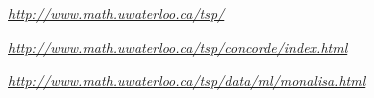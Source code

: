 \begin{thebibliography}{1}

\begin{comment}
\bibitem{alg} Pierluigi Crescenzi, Pierre Fraigniaud, Magnus Halldórsson, Hovhannes A. Harutyunyand, Chiara Pierucci, Andrea Pietracaprina, Geppino Pucci \emph {On the complexity of the shortest-path broadcast problem, Discrete Applied Mathematics , vol. 199, pp. 101-109, 2016.}
\end{comment}

 \emph{\url{http://www.math.uwaterloo.ca/tsp/}}

 \emph{\url{http://www.math.uwaterloo.ca/tsp/concorde/index.html}}

 \emph{\url{http://www.math.uwaterloo.ca/tsp/data/ml/monalisa.html}}


\end{thebibliography}